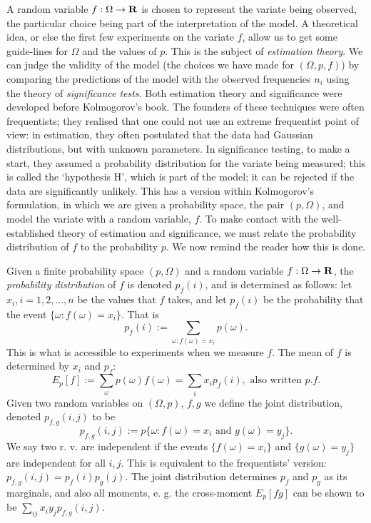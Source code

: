 A random variable $f:\Omega
\rightarrow{\bf R}$ is chosen to
represent the variate being observed, the particular choice being
part of the interpretation of the model. A theoretical idea, or else
the first few experiments on the variate $f$, allow us to get some
guide-lines for $\Omega$ and
the values of $p$. This is the subject of {\em estimation
theory}. We can judge the validity of the model (the choices we have made
for $(\Omega,p,f)$) by comparing the predictions of the model with the
observed frequencies $n_i$
using the theory of {\em significance tests}. Both estimation theory and
significance were developed before Kolmogorov's book. The
founders of these techniques were often frequentists; they realised
that one could not use an extreme frequentist
point of view: in estimation, they often postulated that the data had
Gaussian distributions, but with unknown parameters. In significance
testing, to make a start, they assumed a probability distribution
for the variate being measured; this is called the `hypothesis H',
which is part of the model; it can be rejected
if the data are significantly unlikely. This
has a version within Kolmogorov's formulation, in which we are given a
probability space, the pair $(p,\Omega)$, and model the variate with
a random variable, $f$.
To make contact with the well-established theory of estimation
and significance, we must relate the probability distribution of $f$
to the probability $p$. We now remind the reader how this is done.

Given a finite probability space $(p,\Omega)$ and a
random variable $f:\Omega\rightarrow {\bf R}$, the {\em probability
distribution} of $f$ is denoted $p_f(i)$, and is determined as follows:
let $x_i, i=1,2,\ldots,n$ be the values that
$f$ takes, and let $p_f(i)$ be the probability that the event $\{\omega:f
(\omega)=x_i\}$. That is
\begin{equation}
p_f(i):=\sum_{\omega:f(\omega)=x_i}p(\omega).
\end{equation}
This is what is accessible to experiments when we measure $f$.
The mean of $f$ is determined by $x_i$ and $p_f$:
\begin{equation}
E_p[f]:=\sum_\omega p(\omega)f(\omega)=\sum_i x_ip_f(i),
\mbox{ also written }p.f.
\label{mean}
\end{equation}
Given two random variables on $(\Omega,p)$, $f,g$ we define the joint
distribution, denoted $p_{f,g}(i,j)$ to be
\begin{equation}
p_{f,g}(i,j):=p\{\omega:f(\omega)=x_i\mbox{ and }g(\omega)=y_j\}.
\end{equation}
We say two r. v. are independent if the events $\{f(\omega)=x_i\}$ and
$\{g(\omega)=y_j\}$ are independent for all $i,j$. This is equivalent to
the frequentists' version: $p_{f,g}(i,j)=p_f(i)p_g(j)$.
The joint distribution determines $p_f$ and $p_g$ as its marginals,
and also all moments, e. g. the cross-moment $E_p[fg]$
can be shown to be $\sum_{ij}x_iy_jp_{f,g}(i,j).$

